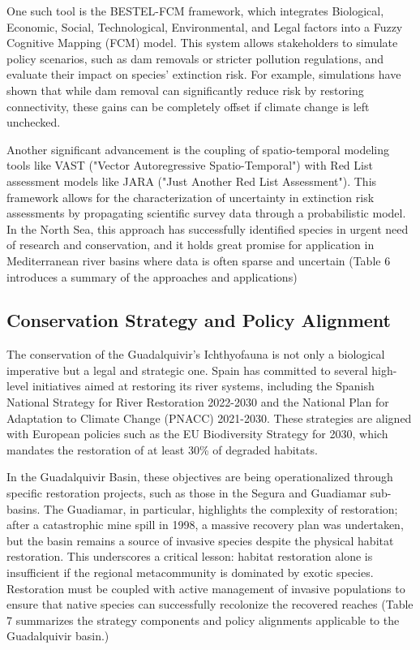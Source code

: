 \documentclass[11pt,a4paper]{article}
\begin{document}
One such tool is the BESTEL-FCM framework, which integrates Biological, Economic, Social, Technological, Environmental, and Legal factors into a Fuzzy Cognitive Mapping (FCM) model. This system allows stakeholders to simulate policy scenarios, such as dam removals or stricter pollution regulations, and evaluate their impact on species' extinction risk. For example, simulations have shown that while dam removal can significantly reduce risk by restoring connectivity, these gains can be completely offset if climate change is left unchecked.

Another significant advancement is the coupling of spatio-temporal modeling tools like VAST ("Vector Autoregressive Spatio-Temporal") with Red List assessment models like JARA ("Just Another Red List Assessment"). This framework allows for the characterization of uncertainty in extinction risk assessments by propagating scientific survey data through a probabilistic model. In the North Sea, this approach has successfully identified species in urgent need of research and conservation, and it holds great promise for application in Mediterranean river basins where data is often sparse and uncertain (Table 6 introduces a summary of the approaches and applications)

\subsection{Conservation Strategy and Policy Alignment}
The conservation of the Guadalquivir’s Ichthyofauna is not only a biological imperative but a legal and strategic one. Spain has committed to several high-level initiatives aimed at restoring its river systems, including the Spanish National Strategy for River Restoration 2022-2030 and the National Plan for Adaptation to Climate Change (PNACC) 2021-2030. These strategies are aligned with European policies such as the EU Biodiversity Strategy for 2030, which mandates the restoration of at least 30\% of degraded habitats.

In the Guadalquivir Basin, these objectives are being operationalized through specific restoration projects, such as those in the Segura and Guadiamar sub-basins. The Guadiamar, in particular, highlights the complexity of restoration; after a catastrophic mine spill in 1998, a massive recovery plan was undertaken, but the basin remains a source of invasive species despite the physical habitat restoration. This underscores a critical lesson: habitat restoration alone is insufficient if the regional metacommunity is dominated by exotic species. Restoration must be coupled with active management of invasive populations to ensure that native species can successfully recolonize the recovered reaches (Table 7 summarizes the strategy components and policy alignments applicable to the Guadalquivir basin.)
\end{document}
